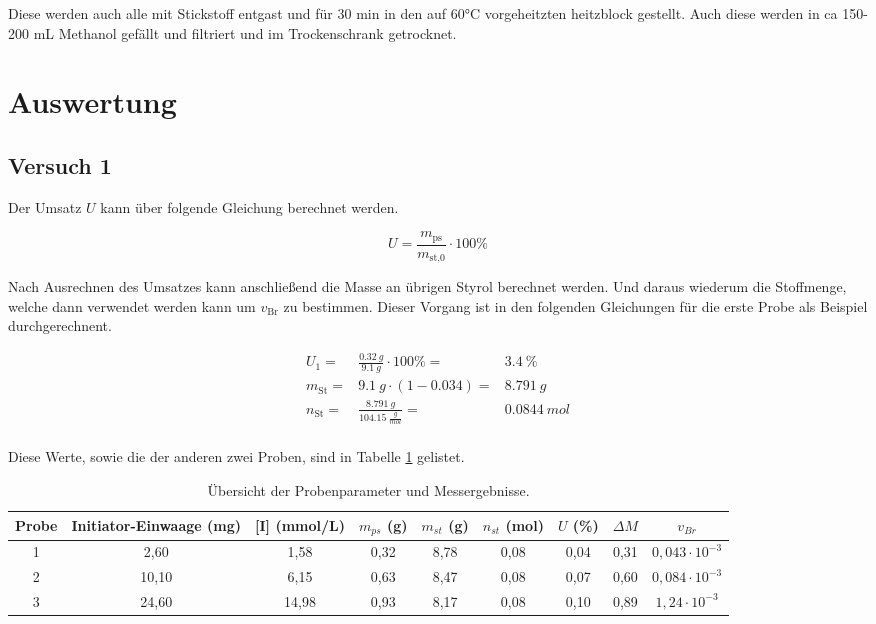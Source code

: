 \documentclass[10pt,a4paper,ngerman]{scrartcl}
\begin{document}
	Diese werden auch alle mit Stickstoff entgast und für 30 min in den auf 60°C vorgeheitzten heitzblock gestellt. 
	Auch diese werden in ca 150-200 mL Methanol gefällt und filtriert und im Trockenschrank getrocknet.


\section{Auswertung}

	\subsection{Versuch 1}
		Der Umsatz $U$ kann über folgende Gleichung berechnet werden.

			\begin{equation}
				U = \frac{m_\text{ps}}{m_\text{st,0}} \cdot 100\%
			\end{equation}

		Nach Ausrechnen des Umsatzes kann anschließend die Masse an übrigen Styrol berechnet werden.
		Und daraus wiederum die Stoffmenge, welche dann verwendet werden kann um $v_\text{Br}$ zu bestimmen.
		Dieser Vorgang ist in den folgenden Gleichungen für die erste Probe als Beispiel durchgerechnent.

			\begin{eqnarray}
				U_1 =& \frac{\SI{0.32}{g}}{\SI{9.1}{g}} \cdot 100\% =&  \SI{3.4}{\%}\\
				m_\text{St} =& \SI{9.1}{g} \cdot (1 - 0.034) =& \SI{8.791}{g}\\
				n_\text{St} =& \frac{\SI{8.791}{g}}{\SI{104.15}{\frac{g}{mol}}} =& \SI{0.0844}{mol}\\
			\end{eqnarray}

		Diese Werte, sowie die der anderen zwei Proben, sind in Tabelle \ref{Tabelle1} gelistet.

			\begin{table}[ht]
				\centering
				\caption{Übersicht der Probenparameter und Messergebnisse.}
				\label{Tabelle1}
				\resizebox{\textwidth}{!}
				{%
				\begin{tabular}{ccccccccc}
					\toprule
					\textbf{Probe} & \textbf{Initiator-Einwaage (mg)} & \textbf{[I] (mmol/L)} & \textbf{$m_{ps}$ (g)} & \textbf{$m_{st}$ (g)} & \textbf{$n_{st}$ (mol)} & \textbf{$U$ (\%)} & \textbf{$\Delta M$} & \textbf{$v_{Br}$} \\
					\midrule
					1 & 2,60  & 1,58 & 0,32 & 8,78 & 0,08 & 0,04 & 0,31 & $0,043 \cdot 10^{-3}$ \\
					2 & 10,10 & 6,15 & 0,63 & 8,47 & 0,08 & 0,07 & 0,60 & $0,084 \cdot 10^{-3}$ \\
					3 & 24,60 & 14,98 & 0,93 & 8,17 & 0,08 & 0,10 & 0,89 & $1,24 \cdot 10^{-3}$ \\
					\bottomrule
				\end{tabular}%
				}
		\end{table}
\end{document}
